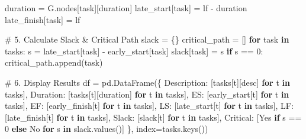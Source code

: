 \documentclass[
  letterpaper,
  DIV=11,
  numbers=noendperiod]{scrreprt}
\newenvironment{Shaded}{\begin{snugshade}}{\end{snugshade}}
\newcommand{\CommentTok}[1]{\textcolor[rgb]{0.37,0.37,0.37}{#1}}
\newcommand{\ControlFlowTok}[1]{\textcolor[rgb]{0.00,0.23,0.31}{\textbf{#1}}}
\newcommand{\DecValTok}[1]{\textcolor[rgb]{0.68,0.00,0.00}{#1}}
\newcommand{\KeywordTok}[1]{\textcolor[rgb]{0.00,0.23,0.31}{\textbf{#1}}}
\newcommand{\NormalTok}[1]{\textcolor[rgb]{0.00,0.23,0.31}{#1}}
\newcommand{\OperatorTok}[1]{\textcolor[rgb]{0.37,0.37,0.37}{#1}}
\newcommand{\StringTok}[1]{\textcolor[rgb]{0.13,0.47,0.30}{#1}}
\begin{document}
\begin{Shaded}
\begin{Highlighting}[]
\NormalTok{    duration }\OperatorTok{=}\NormalTok{ G.nodes[task][}\StringTok{\textquotesingle{}duration\textquotesingle{}}\NormalTok{]}
\NormalTok{    late\_start[task] }\OperatorTok{=}\NormalTok{ lf }\OperatorTok{{-}}\NormalTok{ duration}
\NormalTok{    late\_finish[task] }\OperatorTok{=}\NormalTok{ lf}

\CommentTok{\# 5. Calculate Slack \& Critical Path}
\NormalTok{slack }\OperatorTok{=}\NormalTok{ \{\}}
\NormalTok{critical\_path }\OperatorTok{=}\NormalTok{ []}
\ControlFlowTok{for}\NormalTok{ task }\KeywordTok{in}\NormalTok{ tasks:}
\NormalTok{    s }\OperatorTok{=}\NormalTok{ late\_start[task] }\OperatorTok{{-}}\NormalTok{ early\_start[task]}
\NormalTok{    slack[task] }\OperatorTok{=}\NormalTok{ s}
    \ControlFlowTok{if}\NormalTok{ s }\OperatorTok{==} \DecValTok{0}\NormalTok{:}
\NormalTok{        critical\_path.append(task)}

\CommentTok{\# 6. Display Results}
\NormalTok{df }\OperatorTok{=}\NormalTok{ pd.DataFrame(\{}
    \StringTok{\textquotesingle{}Description\textquotesingle{}}\NormalTok{: [tasks[t][}\StringTok{\textquotesingle{}desc\textquotesingle{}}\NormalTok{] }\ControlFlowTok{for}\NormalTok{ t }\KeywordTok{in}\NormalTok{ tasks],}
    \StringTok{\textquotesingle{}Duration\textquotesingle{}}\NormalTok{: [tasks[t][}\StringTok{\textquotesingle{}duration\textquotesingle{}}\NormalTok{] }\ControlFlowTok{for}\NormalTok{ t }\KeywordTok{in}\NormalTok{ tasks],}
    \StringTok{\textquotesingle{}ES\textquotesingle{}}\NormalTok{: [early\_start[t] }\ControlFlowTok{for}\NormalTok{ t }\KeywordTok{in}\NormalTok{ tasks],}
    \StringTok{\textquotesingle{}EF\textquotesingle{}}\NormalTok{: [early\_finish[t] }\ControlFlowTok{for}\NormalTok{ t }\KeywordTok{in}\NormalTok{ tasks],}
    \StringTok{\textquotesingle{}LS\textquotesingle{}}\NormalTok{: [late\_start[t] }\ControlFlowTok{for}\NormalTok{ t }\KeywordTok{in}\NormalTok{ tasks],}
    \StringTok{\textquotesingle{}LF\textquotesingle{}}\NormalTok{: [late\_finish[t] }\ControlFlowTok{for}\NormalTok{ t }\KeywordTok{in}\NormalTok{ tasks],}
    \StringTok{\textquotesingle{}Slack\textquotesingle{}}\NormalTok{: [slack[t] }\ControlFlowTok{for}\NormalTok{ t }\KeywordTok{in}\NormalTok{ tasks],}
    \StringTok{\textquotesingle{}Critical\textquotesingle{}}\NormalTok{: [}\StringTok{\textquotesingle{}Yes\textquotesingle{}} \ControlFlowTok{if}\NormalTok{ s }\OperatorTok{==} \DecValTok{0} \ControlFlowTok{else} \StringTok{\textquotesingle{}No\textquotesingle{}} \ControlFlowTok{for}\NormalTok{ s }\KeywordTok{in}\NormalTok{ slack.values()]}
\NormalTok{\}, index}\OperatorTok{=}\NormalTok{tasks.keys())}


\end{Highlighting}
\end{Shaded}
\end{document}
